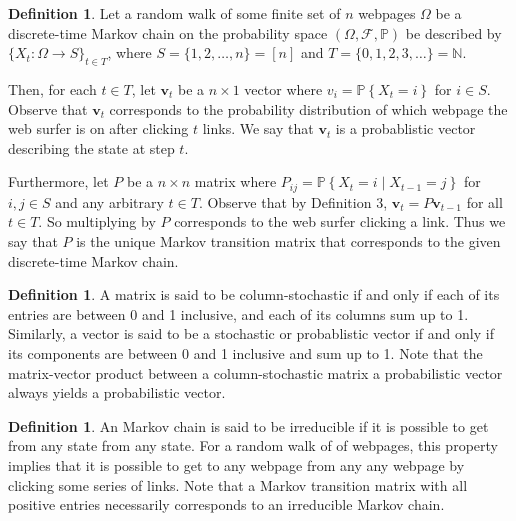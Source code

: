 \documentclass[11pt]{article}
\theoremstyle{definition}
\newtheorem{definition}[theorem]{Definition}
\newcommand{\N}{\mathbb{N}}
\newcommand{\p}[1]{\mathbb{P}\left\{#1\right\}}
\renewcommand{\vec}[1]{\mathbf{#1}}
\begin{document}
\begin{definition}
    Let a random walk of some finite set of $n$ webpages $\Omega$ be a discrete-time Markov chain on the probability space $(\Omega, \mathcal{F}, \mathbb{P})$
    be described by $\{X_t : \Omega \to S\}_{t \in T}$, where $S = \{1, 2, \ldots, n\} = [n]$ and $T = \{0, 1, 2, 3, \ldots\} = \N$.
    
    Then, for each $t \in T$, let $\vec{v}_t$ be a $n \times 1$ vector
    where $v_i = \p{X_t = i}$ for $i \in S$.
    Observe that $\vec{v}_t$ corresponds to the probability distribution of which webpage the web surfer is on after clicking $t$ links.
    We say that $\vec{v}_t$ is a probablistic vector describing the state at step $t$.

    Furthermore, let $P$ be a $n \times n$ matrix
    where $P_{ij} = \p{X_t = i \mid X_{t-1} = j}$ for $i, j \in S$ and any arbitrary $t \in T$. Observe that by Definition 3, $\vec{v}_t = P \vec{v}_{t-1}$ for all $t \in T$.
    So multiplying by $P$ corresponds to the web surfer clicking a link.
    Thus we say that $P$ is the unique Markov transition matrix that corresponds to the given discrete-time Markov chain.
\end{definition}

\begin{definition}
    A matrix is said to be column-stochastic if and only if each of its entries are between 0 and 1 inclusive, and each of its columns sum up to 1.
    Similarly, a vector is said to be a stochastic or probablistic vector if and only if its components are between 0 and 1 inclusive and sum up to 1.
    Note that the matrix-vector product between a column-stochastic matrix a probabilistic vector always yields a probabilistic vector.
\end{definition}

\begin{definition}
    An Markov chain is said to be irreducible if it is possible to get from any state from any state.
    For a random walk of of webpages, this property implies that it is possible to get to any webpage from any any webpage by clicking some series of links.
    Note that a Markov transition matrix with all positive entries necessarily corresponds to an irreducible Markov chain.
\end{definition}
\end{document}
